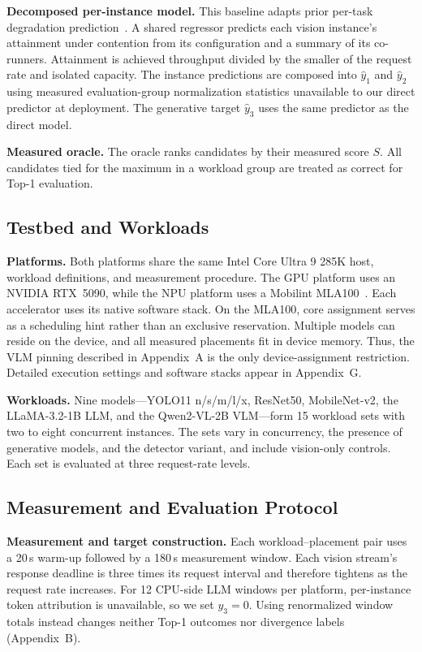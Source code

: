 \documentclass{article}
\begin{document}
\textbf{Decomposed per-instance model.} This baseline adapts prior per-task degradation prediction~\citep{kim_iccd2024_interference}. A shared regressor predicts each vision instance's attainment under contention from its configuration and a summary of its co-runners. Attainment is achieved throughput divided by the smaller of the request rate and isolated capacity. The instance predictions are composed into $\hat y_1$ and $\hat y_2$ using measured evaluation-group normalization statistics unavailable to our direct predictor at deployment. The generative target $\hat y_3$ uses the same predictor as the direct model.

\textbf{Measured oracle.} The oracle ranks candidates by their measured score $S$. All candidates tied for the maximum in a workload group are treated as correct for Top-1 evaluation.

\subsection{Testbed and Workloads}

\textbf{Platforms.} Both platforms share the same Intel Core Ultra 9 285K host, workload definitions, and measurement procedure. The GPU platform uses an NVIDIA RTX~5090, while the NPU platform uses a Mobilint MLA100~\citep{mobilint_mla100}. Each accelerator uses its native software stack. On the MLA100, core assignment serves as a scheduling hint rather than an exclusive reservation. Multiple models can reside on the device, and all measured placements fit in device memory. Thus, the VLM pinning described in Appendix~A is the only device-assignment restriction. Detailed execution settings and software stacks appear in Appendix~G.


\textbf{Workloads.}
Nine models---YOLO11 n/s/m/l/x, ResNet50, MobileNet-v2, the LLaMA-3.2-1B LLM, and the Qwen2-VL-2B VLM---form 15 workload sets with two to eight concurrent instances. The sets vary in concurrency, the presence of generative models, and the detector variant, and include vision-only controls. Each set is evaluated at three request-rate levels.


\subsection{Measurement and Evaluation Protocol}

\textbf{Measurement and target construction.} Each workload--placement pair uses a 20\,s warm-up followed by a 180\,s measurement window. Each vision stream's response deadline is three times its request interval and therefore tightens as the request rate increases. For 12 CPU-side LLM windows per platform, per-instance token attribution is unavailable, so we set $y_3=0$. Using renormalized window totals instead changes neither Top-1 outcomes nor divergence labels (Appendix~B).
\end{document}

